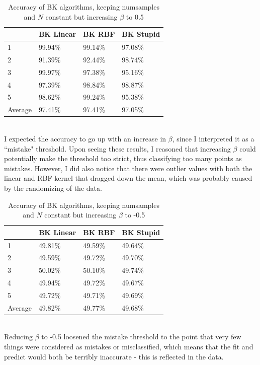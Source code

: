 \documentclass[submit]{harvardml}
\begin{document}
\begin{table}[hbt]
\centering
\caption{Accuracy of BK algorithms, keeping numsamples and $N$ constant but increasing $\beta$ to 0.5}
\label{my-label}
\begin{tabular}{l|lll}
        & BK Linear & BK RBF  & BK Stupid \\ \hline
1       & 99.94\%   & 99.14\% & 97.08\%   \\
2       & 91.39\%   & 92.44\% & 98.74\%   \\
3       & 99.97\%   & 97.38\% & 95.16\%   \\
4       & 97.39\%   & 98.84\% & 98.87\%   \\
5       & 98.62\%   & 99.24\% & 95.38\%   \\ \hline
Average & 97.41\%   & 97.41\% & 97.05\%  
\end{tabular} 
\end{table} \\
\noindent I expected the accuracy to go up with an increase in $\beta$, since I interpreted it as a ``mistake" threshold. Upon seeing these results, I reasoned that increasing $\beta$ could potentially make the threshold too strict, thus classifying too many points as mistakes. However, I did also notice that there were outlier values with both the linear and RBF kernel that dragged down the mean, which was probably caused by the randomizing of the data. 
\begin{table}[hbt]
\centering
\caption{Accuracy of BK algorithms, keeping numsamples and $N$ constant but increasing $\beta$ to -0.5}
\label{my-label}
\begin{tabular}{l|lll}
        & BK Linear & BK RBF  & BK Stupid \\ \hline
1       & 49.81\%   & 49.59\% & 49.64\%   \\
2       & 49.59\%   & 49.72\% & 49.70\%   \\
3       & 50.02\%   & 50.10\% & 49.74\%   \\
4       & 49.94\%   & 49.72\% & 49.67\%   \\
5       & 49.72\%   & 49.71\% & 49.69\%   \\ \hline
Average & 49.82\%   & 49.77\% & 49.68\%  
\end{tabular}
\end{table} \\
\noindent Reducing $\beta$ to -0.5 loosened the mistake threshold to the point that very few things were considered as mistakes or misclassified, which means that the fit and predict would both be terribly inaccurate - this is reflected in the data.\\\\
\end{document}
